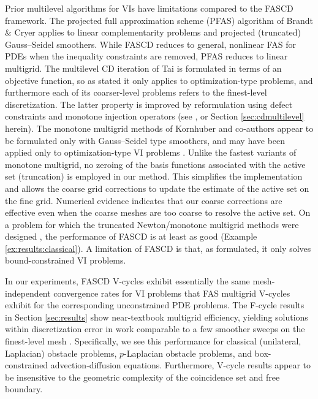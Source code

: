\documentclass[review,hidelinks,onefignum,onetabnum]{siamart220329}
\begin{document}
Prior multilevel algorithms for VIs have limitations compared to the FASCD framework.  The projected full approximation scheme (PFAS) algorithm of Brandt \& Cryer \cite{BrandtCryer1983} applies to linear complementarity problems and projected (truncated) Gauss--Seidel smoothers.  While FASCD reduces to general, nonlinear FAS for PDEs when the inequality constraints are removed, PFAS reduces to linear multigrid.  The multilevel CD iteration of Tai \cite{Tai2003} is formulated in terms of an objective function, so as stated it only applies to optimization-type problems, and furthermore each of its coarser-level problems refers to the finest-level discretization.  The latter property is improved by reformulation using defect constraints and monotone injection operators (see \cite[Algorithm 4.2]{GraeserKornhuber2009}, or Section \ref{sec:cdmultilevel} herein).  The monotone multigrid methods of Kornhuber and co-authors \cite{GraeserKornhuber2009,Kornhuber1994} appear to be formulated only with Gauss--Seidel type smoothers, and may have been applied only to optimization-type VI problems \cite[for example]{JouvetGraeser2013}.  Unlike the fastest variants of monotone multigrid, no zeroing of the basis functions associated with the active set (truncation) is employed in our method.  This simplifies the implementation and allows the coarse grid corrections to update the estimate of the active set on the fine grid.  Numerical evidence indicates that our coarse corrections are effective even when the coarse meshes are too coarse to resolve the active set.  On a problem for which the truncated Newton/monotone multigrid methods were designed \cite[problem 7.1.1]{GraeserKornhuber2009}, the performance of FASCD is at least as good (Example \ref{ex:results:classical}).  A limitation of FASCD is that, as formulated, it only solves bound-constrained VI problems.

In our experiments, FASCD V-cycles exhibit essentially the same mesh-independent convergence rates for VI problems that FAS multigrid V-cycles exhibit for the corresponding unconstrained PDE problems.  The F-cycle results in Section \ref{sec:results} show near-textbook multigrid efficiency, yielding solutions within discretization error in work comparable to a few smoother sweeps on the finest-level mesh \cite{BrandtLivne2011}.  Specifically, we see this performance for classical (unilateral, Laplacian) obstacle problems, $p$-Laplacian obstacle problems, and box-constrained advection-diffusion equations.  Furthermore, V-cycle results appear to be insensitive to the geometric complexity of the coincidence set and free boundary.
\end{document}
